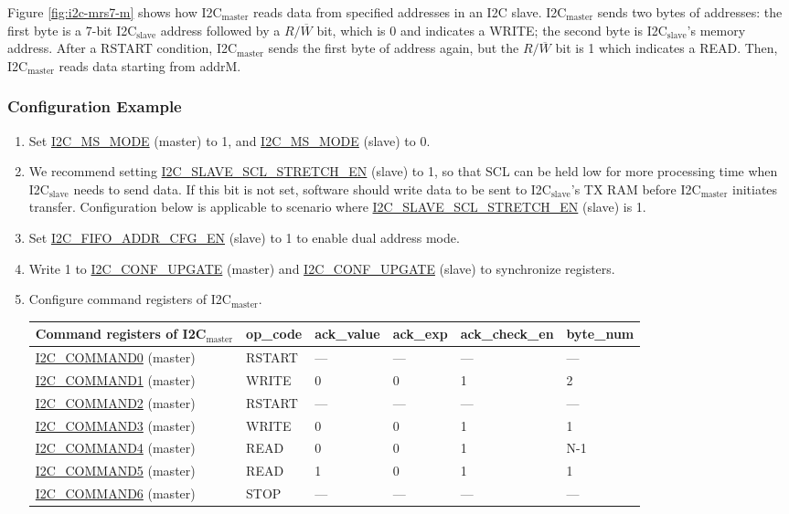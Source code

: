 \documentclass[main\_\_EN.tex]{subfiles}
\begin{document}
Figure \ref{fig:i2c-mrs7-m} shows how I2C$_\text{master}$ reads data from specified addresses in an I2C slave. I2C$_\text{master}$ sends two bytes of addresses: the first byte is a 7-bit I2C$_\text{slave}$ address followed by a $R/\overline W$ bit, which is 0 and indicates a WRITE; the second byte is I2C$_\text{slave}$'s memory address. After a RSTART condition, I2C$_\text{master}$ sends the first byte of address again, but the $R/\overline W$ bit is 1 which indicates a READ. Then, I2C$_\text{master}$ reads data starting from addrM.

\subsubsection{Configuration Example}
\begin{enumerate}
\item Set \hyperref[fielddesc:I2CMSMODE]{I2C\_MS\_MODE} (master) to 1, and \hyperref[fielddesc:I2CMSMODE]{I2C\_MS\_MODE} (slave) to 0.
\item We recommend setting \hyperref[fielddesc:I2CSLAVESCLSTRETCHEN]{I2C\_SLAVE\_SCL\_STRETCH\_EN} (slave) to 1, so that SCL can be held low for more processing time when I2C$_\text{slave}$ needs to send data. If this bit is not set, software should write data to be sent to I2C$_\text{slave}$'s TX RAM before I2C$_\text{master}$ initiates transfer. Configuration below is applicable to scenario where \hyperref[fielddesc:I2CSLAVESCLSTRETCHEN]{I2C\_SLAVE\_SCL\_STRETCH\_EN} (slave) is 1. 
\item  Set \hyperref[fielddesc:I2CFIFOADDRCFGEN]{I2C\_FIFO\_ADDR\_CFG\_EN} (slave) to 1 to enable dual address mode.
\item Write 1 to \hyperref[fielddesc:I2CCONFUPGATE]{I2C\_CONF\_UPGATE} (master) and \hyperref[fielddesc:I2CCONFUPGATE]{I2C\_CONF\_UPGATE} (slave) to synchronize registers.
\item Configure command registers of I2C$_\text{master}$.
\begin{longtable}{ | p{4cm} | p{2cm} | p{2cm} | p{2cm} |p{2cm} | p{2cm} |}
\hline\rowcolor{lightgray}
Command registers of I2C$_\text{master}$& op\_code & ack\_value&ack\_exp&ack\_check\_en&byte\_num  \\ \hline
\hyperref[fielddesc:I2CCOMMAND0]{I2C\_COMMAND0} (master)& RSTART& ---&---&---&---  \\ \hline
\hyperref[fielddesc:I2CCOMMAND1]{I2C\_COMMAND1} (master)& WRITE& 0&0&1&2  \\ \hline
\hyperref[fielddesc:I2CCOMMAND2]{I2C\_COMMAND2} (master)& RSTART& ---&---&---&---  \\ \hline
\hyperref[fielddesc:I2CCOMMAND3]{I2C\_COMMAND3} (master)& WRITE& 0&0&1&1  \\ \hline
\hyperref[fielddesc:I2CCOMMAND4]{I2C\_COMMAND4} (master)& READ& 0&0&1&N-1  \\ \hline
\hyperref[fielddesc:I2CCOMMAND5]{I2C\_COMMAND5} (master)& READ& 1&0&1&1  \\ \hline
\hyperref[fielddesc:I2CCOMMAND6]{I2C\_COMMAND6} (master)& STOP& ---&---&---&---  \\ \hline
\end{longtable}


\end{enumerate}
\end{document}
